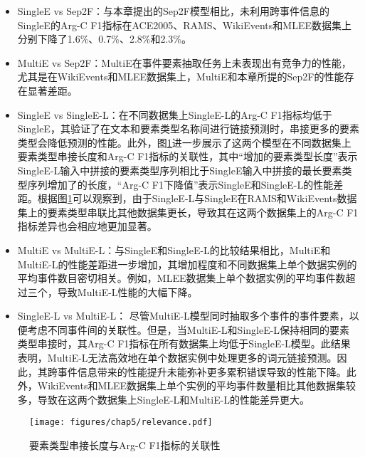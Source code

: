 \begin{itemize}
\item SingleE vs Sep2F：与本章提出的Sep2F模型相比，未利用跨事件信息的SingleE的Arg-C F1指标在ACE2005、RAMS、WikiEvents和MLEE数据集上分别下降了1.6\%、0.7\%、2.8\%和2.3\%。
\item MultiE vs Sep2F：MultiE在事件要素抽取任务上未表现出有竞争力的性能，尤其是在WikiEvents和MLEE数据集上，MultiE和本章所提的Sep2F的性能存在显著差距。
\item SingleE vs SingleE-L：在不同数据集上SingleE-L的Arg-C F1指标均低于SingleE，其验证了在文本和要素类型名称间进行链接预测时，串接更多的要素类型会降低预测的性能。此外，图\ref{relevance}进一步展示了这两个模型在不同数据集上要素类型串接长度和Arg-C F1指标的关联性，其中“增加的要素类型长度”表示SingleE-L输入中拼接的要素类型序列相比于SingleE输入中拼接的最长要素类型序列增加了的长度，“Arg-C F1下降值”表示SingleE和SingleE-L的性能差距。根据图\ref{relevance}可以观察到，由于SingleE-L与SingleE在RAMS和WikiEvents数据集上的要素类型串联比其他数据集更长，导致其在这两个数据集上的Arg-C F1指标差异也会相应地更加显著。
\item MultiE vs MultiE-L：与SingleE和SingleE-L的比较结果相比，MultiE和MultiE-L的性能差距进一步增加，其增加程度和不同数据集上单个数据实例的平均事件数目密切相关。例如，MLEE数据集上单个数据实例的平均事件数超过三个，导致MultiE-L性能的大幅下降。
\item SingleE-L vs MultiE-L： 尽管MultiE-L模型同时抽取多个事件的事件要素，以便考虑不同事件间的关联性。但是，当MultiE-L和SingleE-L保持相同的要素类型串接时，其Arg-C F1指标在所有数据集上均低于SingleE-L模型。此结果表明，MultiE-L无法高效地在单个数据实例中处理更多的词元链接预测。因此，其跨事件信息带来的性能提升未能弥补更多累积错误导致的性能下降。此外，WikiEvents和MLEE数据集上单个实例的平均事件数量相比其他数据集较多，导致在这两个数据集上SingleE-L和MultiE-L的性能差异更大。
\end{itemize}

\begin{figure}[htp]
\centering
\texttt{[image: figures/chap5/relevance.pdf]}
\caption{要素类型串接长度与Arg-C F1指标的关联性}
\label{relevance}
\end{figure}

